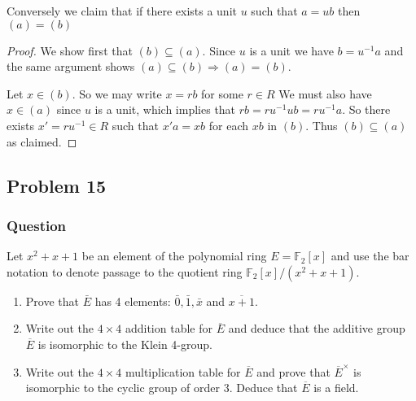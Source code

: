 \documentclass[12pt]{article}
\begin{document}
Conversely we claim that if there exists a unit $u$ such that $a = u b$ then $(a) = (b)$ 

\begin{proof} We show first that $(b) \subseteq (a)$. Since $u$ is a unit we have $b = u^{-1} a $ and the same argument shows $(a) \subseteq (b) \Rightarrow (a)=(b)$.

Let $x \in (b)$. So we may write $ x = r b$ for some $r \in R$  We must also have $ x \in (a)$ since $u$ is a unit, which implies that $ r b = r u^{-1} u b = r u^{-1} a $.  So there exists $x' = r u^{-1} \in R$ such that $x' a = x b$ for each $x b $ in $(b)$. Thus $(b)\subseteq (a)$ as claimed.\end{proof}

\subsection{Problem 15}

\subsubsection{Question}
Let $x^2 +x+1$ be an element of the polynomial ring $E = \mathbb{F}_2 [x]$ and use the bar notation to denote passage to the quotient ring $\mathbb{F}_2 [x] / (x^2+x+1)$.
\begin{enumerate}
\item Prove that $\bar{E}$ has 4 elements: $\bar{0}, \bar{1}, \bar{x}$ and $\overline{x+1}$.
\item Write out the $4 \times 4$ addition table for $\overline{E}$ and deduce that the additive group $\overline{E}$ is isomorphic to the Klein 4-group.
\item Write out the $4 \times 4$ multiplication table for $\overline{E}$ and prove that $\overline{E}^\times$ is isomorphic to the cyclic group of order 3. Deduce that $\overline{E}$ is a field.
\end{enumerate}
\end{document}
